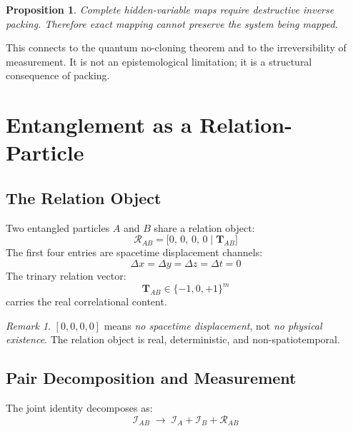 \documentclass[11pt, a4paper, oneside]{article}
\theoremstyle{definition}
\theoremstyle{plain}
\newtheorem{proposition}{Proposition}[section]
\theoremstyle{remark}
\newtheorem{remark}{Remark}[section]
\begin{document}
\begin{proposition}
  Complete hidden-variable maps require destructive inverse packing.
  Therefore exact mapping cannot preserve the system being mapped.
\end{proposition}

This connects to the quantum no-cloning theorem and to the irreversibility
of measurement. It is not an epistemological limitation; it is a structural
consequence of packing.

\section{Entanglement as a Relation-Particle}

\subsection{The Relation Object}

Two entangled particles $A$ and $B$ share a relation object:
\begin{equation}
  \mathcal{R}_{AB} = \bigl[0,\, 0,\, 0,\, 0\;\big|\;\mathbf{T}_{AB}\bigr]
  \label{eq:relation-object}
\end{equation}
The first four entries are spacetime displacement channels:
\begin{equation}
  \Delta x = \Delta y = \Delta z = \Delta t = 0
\end{equation}
The trinary relation vector:
\begin{equation}
  \mathbf{T}_{AB} \in \{-1, 0, +1\}^m
\end{equation}
carries the real correlational content.

\begin{remark}
  $[0,0,0,0]$ means \emph{no spacetime displacement}, not
  \emph{no physical existence}. The relation object is real,
  deterministic, and non-spatiotemporal.
\end{remark}

\subsection{Pair Decomposition and Measurement}

The joint identity decomposes as:
\begin{equation}
  \mathcal{I}_{AB} \;\to\; \mathcal{I}_A + \mathcal{I}_B + \mathcal{R}_{AB}
  \label{eq:pair-decomposition}
\end{equation}
\end{document}
